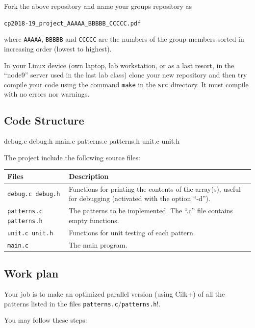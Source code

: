 \documentclass[11pt]{article}
\begin{document}
Fork the above repository and name your groups repository as

\verb!cp2018-19_project_AAAAA_BBBBB_CCCCC.pdf!

where \verb!AAAAA!,  \verb!BBBBB! and  \verb!CCCCC! are the numbers of the group members sorted in increasing order (lowest to highest).

In your Linux device (own laptop, lab workstation, or as a last resort, in the “node9” server used in the last lab class) clone your new repository and then try compile your code using the command \verb!make! in the \verb!src! directory.  It must compile with no errors nor warnings.


\subsection{Code Structure}

debug.c debug.h main.c patterns.c patterns.h unit.c unit.h

The project include the following source files:

\begin{tabularx}{\linewidth}{lX}
  \toprule
  \textbf{Files} & \textbf{Description}\\
  \midrule
  \texttt{debug.c debug.h}
   & Functions for printing the contents of the array(s), useful for debugging (activated with the option “-d”).\\
  \texttt{patterns.c patterns.h}
  & The patterns to be implemented.  The “.c” file contains empty functions.\\
  \texttt{unit.c unit.h} 
  & Functions for unit testing of each pattern.\\
  \texttt{main.c} 
  & The main program.\\
  \bottomrule
\end{tabularx}


\subsection{Work plan}

Your job is to make an optimized parallel version (using Cilk+) of all the patterns listed in the files \verb!patterns.c!/\verb!patterns.h!!.

You may follow these steps:
\end{document}

